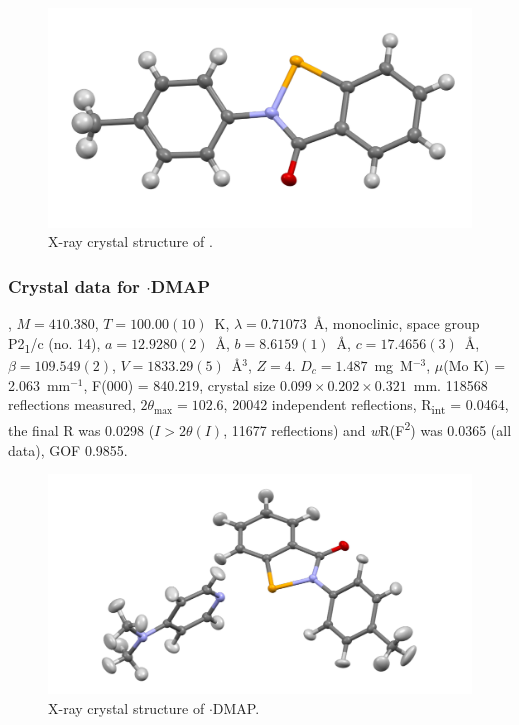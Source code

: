 \begin{refsection}
\begin{figure}
  \includegraphics[width=0.6\linewidth]{Figures/ebs-4me-xtal.pdf}
  \caption{X-ray crystal structure of \texorpdfstring{}{C14 H11 N O Se}.}
\end{figure}

\subsubsection{Crystal data for \texorpdfstring{$ \cdot $DMAP}{C21 H21 N3 O Se}}
, $M=410.380$, $T=100.00(10)$~K, $ \lambda=0.71073 $~\AA, monoclinic, space group P2\textsubscript{1}/c (no. 14), $a = 12.9280(2)$~\AA, $b = 8.6159(1)$~\AA, $c = 17.4656(3)$~\AA, $\beta = 109.549(2)$\degree, $V = 1833.29(5)$~\AA$^{3}$, $Z = 4$. $D_{c}= 1.487$~mg~M$^{-3}$, $\mu$(Mo K\a) = 2.063~mm$^{-1}$, F(000) = 840.219, crystal size $0.099 \times 0.202 \times 0.321$~mm. 118568 reflections measured, $2\theta_{\max}=102.6$\degree, 20042 independent reflections, R\textsubscript{int} = 0.0464, the final R was 0.0298 ($I > 2\theta(I)$, 11677 reflections) and \textit{w}R(F\textsuperscript{2}) was 0.0365 (all data), GOF 0.9855.

\begin{figure}
  \includegraphics[width=0.6\linewidth]{Figures/ebs-4me-dmap-xtal.pdf}
  \caption{X-ray crystal structure of \texorpdfstring{$ \cdot $DMAP}{C21 H21 N3 O Se}.}
\end{figure}


\end{refsection}
